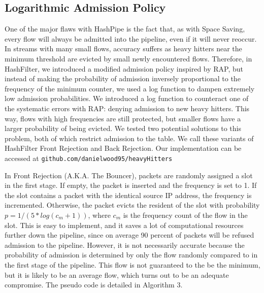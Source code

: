 \subsection{Logarithmic Admission Policy}
One of the major flaws with HashPipe is the fact that, as with Space Saving, every flow will always be admitted into the pipeline, even if it will never reoccur. In streams with many small flows, accuracy suffers as heavy hitters near the minimum threshold are evicted by small newly encountered flows. Therefore, in HashFilter, we introduced a modified admission policy inspired by RAP, but instead of making the probability of admission inversely proportional to the frequency of the minimum counter, we used a log function to dampen extremely low admission probabilities. We introduced a log function to counteract one of the systematic errors with RAP: denying admission to new heavy hitters. This way, flows with high frequencies are still protected, but smaller flows have a larger probability of being evicted. We tested two potential solutions to this problem, both of which restrict admission to the table. We call these variants of HashFilter Front Rejection and Back Rejection. Our implementation can be accessed at \verb+github.com/danielwood95/heavyHitters+

In Front Rejection (A.K.A. The Bouncer), packets are randomly assigned a slot in the first stage. If empty, the packet is inserted and the frequency is set to 1. If the slot contains a packet with the identical source IP address, the frequency is incremented. Otherwise, the packet evicts the resident of the slot with probability $p = 1 / (5*log(c_m + 1))$, where $c_m$ is the frequency count of the flow in the slot. This is easy to implement, and it saves a lot of computational resources further down the pipeline, since on average 90 percent of packets will be refused admission to the pipeline. However, it is not necessarily accurate because the probability of admission is determined by only the flow randomly compared to in the first stage of the pipeline. This flow is not guaranteed to the be the minimum, but it is likely to be an average flow, which turns out to be an adequate compromise. The pseudo code is detailed in Algorithm 3. 

